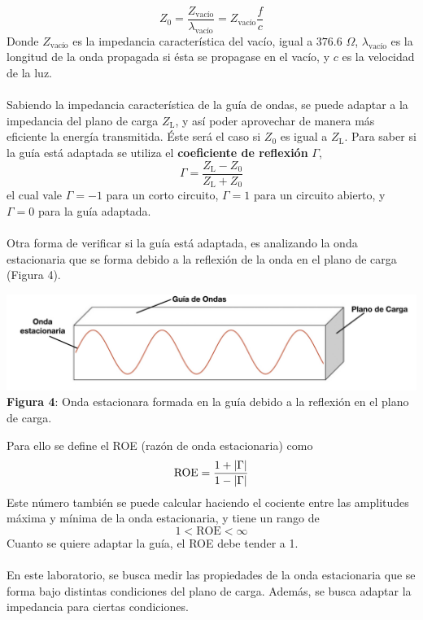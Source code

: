 \documentclass[11pt,a4paper]{article}
\DeclarePairedDelimiter\abs{\lvert}{\rvert}%
\begin{document}
\begin{multicols}{2}
\begin{equation}
    Z_0=\frac{Z_\text{vacío}}{\lambda_\text{vacío}}=Z_\text{vacío}\frac{f}{c}
\end{equation}
Donde $Z_\text{vacío}$ es la impedancia característica del vacío, igual a $376.6$ $\Omega$, $\lambda_\text{vacío}$ es la longitud de la onda propagada si ésta se propagase en el vacío, y $c$ es la velocidad de la luz.\\ \\
Sabiendo la impedancia característica de la guía de ondas, se puede adaptar a la impedancia del plano de carga $Z_\text{L}$, y así poder aprovechar de manera más eficiente la energía transmitida. Éste será el caso si $Z_0$ es igual a $Z_\text{L}$. Para saber si la guía está adaptada se utiliza el \textbf{coeficiente de reflexión} $\Gamma$,
\begin{equation}
    \Gamma = \frac{Z_\text{L}-Z_0}{Z_\text{L}+Z_0}
\end{equation}
el cual vale $\Gamma = -1$ para un corto circuito, $\Gamma = 1$ para un circuito abierto, y $\Gamma = 0$ para la guía adaptada. \\ \\ 
Otra forma de verificar si la guía está adaptada, es analizando la onda estacionaria que se forma debido a la reflexión de la onda en el plano de carga (Figura 4).
\begin{center}
    \includegraphics[scale=0.28]{images/Para el informe.jpg} \\
    \textbf{Figura 4}: Onda estacionara formada en la guía debido a la reflexión en el plano de carga. 
\end{center}
Para ello se define el ROE (razón de onda estacionaria) como
\begin{equation}
    \text{ROE} = \frac{1+\abs{\Gamma}}{1-\abs{\Gamma}}
\end{equation}
Este número también se puede calcular haciendo el cociente entre las amplitudes máxima y mínima de la onda estacionaria, y tiene un rango de 
$$
1<\text{ROE} < \infty
$$
Cuanto se quiere adaptar la guía, el ROE debe tender a 1. \\ \\
En este laboratorio, se busca medir las propiedades de la onda estacionaria que se forma bajo distintas condiciones del plano de carga. Además, se busca adaptar la impedancia para ciertas condiciones. 

\end{multicols}
\end{document}
